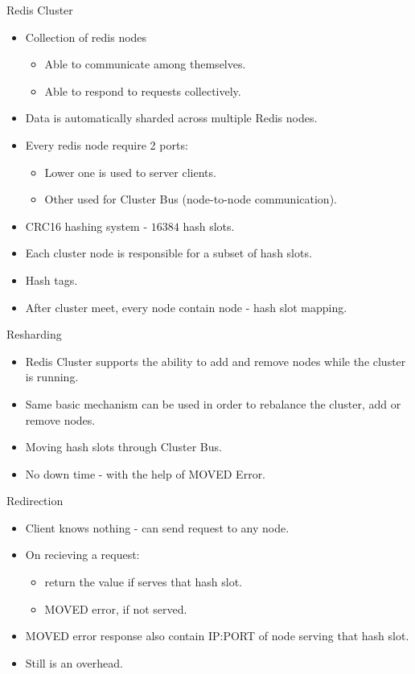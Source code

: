 \documentclass{beamer}
\begin{document}
\begin{frame}{Redis Cluster}
    \begin{itemize}
        \item Collection of redis nodes
            \begin{itemize}
                \item Able to communicate among themselves.
                \item Able to respond to requests collectively.
            \end{itemize}
        \item Data is automatically sharded across multiple Redis nodes.
        \item Every redis node require 2 ports:
            \begin{itemize}
                \item Lower one is used to server clients.
                \item Other used for Cluster Bus (node-to-node communication).
            \end{itemize}
        \item CRC16 hashing system - $16384$ hash slots.
        \item Each cluster node is responsible for a subset of hash slots.
        \item Hash tags.
        \item After cluster meet, every node contain node - hash slot mapping.
    \end{itemize}
\end{frame}

\begin{frame}{Resharding}
\begin{itemize}
    \item Redis Cluster supports the ability to add and remove nodes while the cluster is running.
    \item Same basic mechanism can be used in order to rebalance the cluster, add or remove nodes.
    \item Moving hash slots through Cluster Bus.
    \item No down time - with the help of MOVED Error.
\end{itemize}
\end{frame}

\begin{frame}{Redirection}
\begin{itemize}
    \item Client knows nothing - can send request to any node.
    \item On recieving a request:
        \begin{itemize}
            \item return the value if serves that hash slot.
            \item MOVED error, if not served.
        \end{itemize}
    \item MOVED error response also contain IP:PORT of node serving that hash slot.
    \item Still is an overhead.
\end{itemize}
\end{frame}
\end{document}
